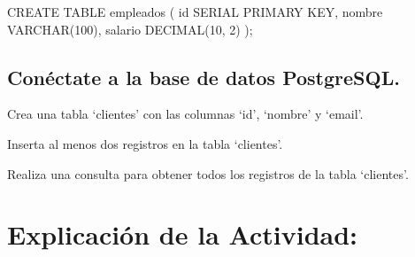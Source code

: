 \documentclass[
  a4paper,
  onepage,
  openany]{scrreprt}
\newenvironment{Shaded}{\begin{snugshade}}{\end{snugshade}}
\newcommand{\DataTypeTok}[1]{\textcolor[rgb]{0.68,0.00,0.00}{#1}}
\newcommand{\DecValTok}[1]{\textcolor[rgb]{0.68,0.00,0.00}{#1}}
\newcommand{\KeywordTok}[1]{\textcolor[rgb]{0.00,0.23,0.31}{#1}}
\newcommand{\NormalTok}[1]{\textcolor[rgb]{0.00,0.23,0.31}{#1}}
\begin{document}
\begin{Shaded}
\begin{Highlighting}[]
\KeywordTok{CREATE} \KeywordTok{TABLE}\NormalTok{ empleados (}
    \KeywordTok{id}\NormalTok{ SERIAL }\KeywordTok{PRIMARY} \KeywordTok{KEY}\NormalTok{,}
\NormalTok{    nombre }\DataTypeTok{VARCHAR}\NormalTok{(}\DecValTok{100}\NormalTok{),}
\NormalTok{    salario }\DataTypeTok{DECIMAL}\NormalTok{(}\DecValTok{10}\NormalTok{, }\DecValTok{2}\NormalTok{)}
\NormalTok{);}
\end{Highlighting}
\end{Shaded}

\begin{tcolorbox}[enhanced jigsaw, breakable, opacityback=0, toptitle=1mm, coltitle=black, toprule=.15mm, rightrule=.15mm, colframe=quarto-callout-important-color-frame, opacitybacktitle=0.6, arc=.35mm, title=\textcolor{quarto-callout-important-color}{\faExclamation}\hspace{0.5em}{Actividad Práctica}, titlerule=0mm, colbacktitle=quarto-callout-important-color!10!white, bottomtitle=1mm, bottomrule=.15mm, colback=white, left=2mm, leftrule=.75mm]

\hypertarget{conuxe9ctate-a-la-base-de-datos-postgresql.-1}{%
\section{Conéctate a la base de datos
PostgreSQL.}\label{conuxe9ctate-a-la-base-de-datos-postgresql.-1}}

Crea una tabla `clientes' con las columnas `id', `nombre' y `email'.

Inserta al menos dos registros en la tabla `clientes'.

Realiza una consulta para obtener todos los registros de la tabla
`clientes'.

\end{tcolorbox}

\hypertarget{explicaciuxf3n-de-la-actividad-75}{%
\section{Explicación de la
Actividad:}\label{explicaciuxf3n-de-la-actividad-75}}
\end{document}
